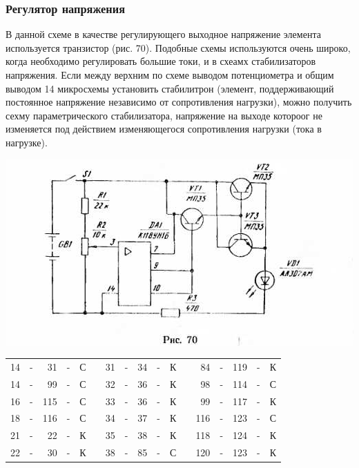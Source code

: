 \documentclass[12pt]{article}
\begin{document}
\newpage

\subsubsection{Регулятор напряжения}

В данной схеме в качестве регулирующего выходное напряжение элемента используется транзистор (рис. 70). Подобные схемы используются очень широко, когда необходимо регулировать большие токи, и в схеамх стабилизаторов напряжения. Если между верхним по схеме выводом потенциометра и общим выводом 14 микросхемы установить стабилитрон (элемент, поддерживающий постоянное напряжение независимо от сопротивления нагрузки), можно получить сехму параметрического стабилизатора, напряжение на выходе котороог не изменяется под действием изменяющегося сопротивления нагрузки (тока в нагрузке).

\vspace{1cm}

\includegraphics[scale=1, angle=0]{ekon3_070_1}

\vspace{1cm}

\hrulefill

\begin{tabular}{r c r c r p{2cm} r c r c r p{2cm} r c r c r}
14 & - &  31 & - & С &     & 31 & - &  34 & - & К &    &  84 & - & 119  & - & К\\
14 & - &  99 & - & С &     & 32 & - &  36 & - & К &    &  98 & - & 114  & - & С\\
16 & - & 115 & - & С &     & 33 & - &  36 & - & К &    &  99 & - & 117  & - & К\\
18 & - & 116 & - & С &     & 34 & - &  37 & - & К &    & 116 & - & 123  & - & С\\
21 & - &  22 & - & К &     & 35 & - &  38 & - & К &    & 118 & - & 124  & - & К\\
22 & - &  30 & - & К &     & 38 & - &  85 & - & С &    & 120 & - & 123  & - & К\\
\end{tabular}
\end{document}
